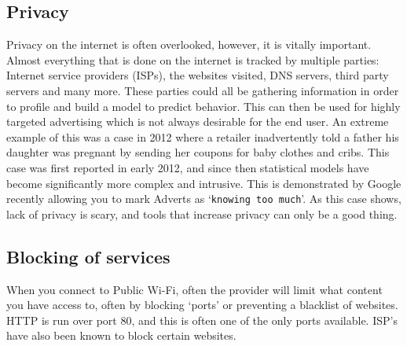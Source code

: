 \subsection{Privacy}
Privacy on the internet is often overlooked, however, it is vitally important\cite{privacyrulez}. Almost everything that is done on the internet is tracked by multiple parties: Internet service providers (ISPs), the websites visited, DNS servers, third party servers and many more. These parties could all be gathering information in order to profile and build a model to predict behavior. This can then be used for highly targeted advertising which is not always desirable for the end user. An extreme example of this was a case in 2012 where a retailer inadvertently told a father his daughter was pregnant by sending her coupons for baby clothes and cribs.\cite{babyshower}
This case was first reported in early 2012, and since then statistical models have become significantly more complex and intrusive. This is demonstrated by Google recently allowing you to mark Adverts as `\texttt{knowing too much}'\cite{googlearewatching}.
As this case shows, lack of privacy is scary, and tools that increase privacy can only be a good thing. 

\subsection{Blocking of services}
When you connect to Public Wi-Fi, often the provider will limit what content you have access to, often by blocking `ports' or preventing a blacklist of websites.\\
HTTP is run over port 80, and this is often one of the only ports available. ISP's have also been known to block certain websites.

